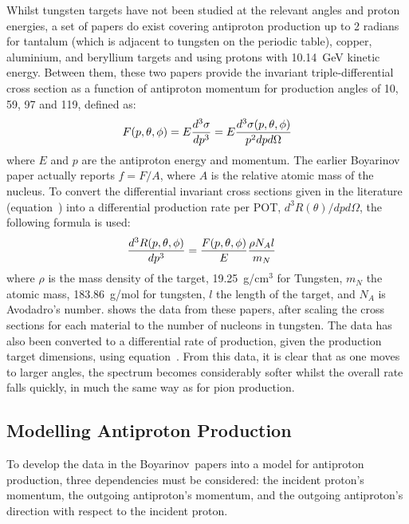 \FigAntiprotonData
Whilst tungsten targets have not been studied at the relevant angles and proton energies, a set of papers \cite{Boyarinov:1994tp,Kiselev:2012sj} do exist covering antiproton production up to 2 radians for tantalum (which is adjacent to tungsten on the periodic table), copper, aluminium, and beryllium targets and using protons with 10.14~GeV kinetic energy.
Between them, these two papers provide the invariant triple-differential cross section as a function of antiproton momentum for production angles of 10, 59, 97 and 119\degree, defined as:
\begin{equation}
\eqlabel{bg:antiprotons:lit}
	F(p,\theta,\phi)=E \frac{d^3\sigma}{dp^3}=E\frac{d^3\sigma(p,\theta,\phi)}{p^2dpd\Omega}
\end{equation}
where $E$ and $p$ are the antiproton energy and momentum.  The earlier Boyarinov paper actually reports $f=F/A$, where $A$ is the relative atomic mass of the nucleus.
To convert the differential invariant cross sections given in the literature (equation~) into a differential production rate per \ac{POT}, $d^3R(\theta)/dpd\Omega$, the following formula is used:
\begin{align}
	\eqlabel{bg:antiprotons:rate}
	\frac{d^3R(p,\theta,\phi)}{dp^3}&=\frac{F(p,\theta,\phi)}{E}\frac{\rho N_A l}{m_N}
\end{align}
where $\rho$ is the mass density of the target, 19.25~g/cm$^3$ for Tungsten, $m_N$ the atomic mass, 183.86~g/mol for tungsten, $l$ the length of the target, and $N_A$ is Avodadro's number.
 shows the data from these papers, after scaling the cross sections for each material to the number of nucleons in tungsten.
The data has also been converted to a differential rate of production, given the \phaseII production target dimensions, using equation~.
From this data, it is clear that as one moves to larger angles, the spectrum becomes considerably softer whilst the overall rate falls quickly, in much the same way as for pion production.

\subsection{Modelling Antiproton Production}
To develop the data in the Boyarinov~\etal papers into a model for antiproton production, three dependencies must be considered:
the incident proton's momentum, the outgoing antiproton's momentum, and the outgoing antiproton's direction with respect to the incident proton.

